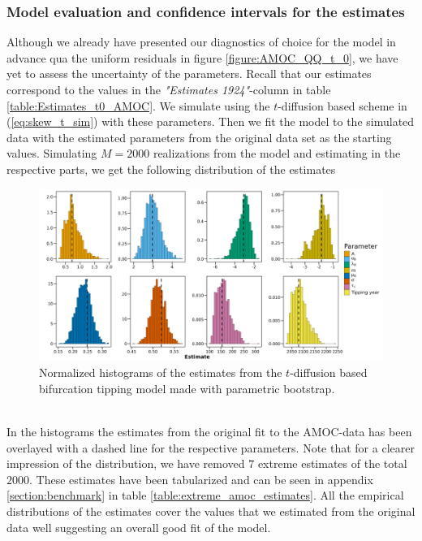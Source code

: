 \subsubsection{Model evaluation and confidence intervals for the estimates}
Although we already have presented our diagnostics of choice for the model in advance qua the uniform residuals in figure \ref{figure:AMOC_QQ_t_0}, we have yet to assess the uncertainty of the parameters. Recall that our estimates correspond to the values in the \textit{"Estimates 1924"}-column in table \ref{table:Estimates_t0_AMOC}. We simulate using the $t$-diffusion based scheme in (\ref{eq:skew_t_sim}) with these parameters. Then we fit the model to the simulated data with the estimated parameters from the original data set as the starting values. Simulating $M = 2000$ realizations from the model and estimating in the respective parts, we get the following distribution of the estimates
\begin{figure}[h!]
    \begin{center}
    \includegraphics[scale = .095]{figures/estim_tibble_plot.jpeg}
    \caption{Normalized histograms of the estimates from the $t$-diffusion based bifurcation tipping model made with parametric bootstrap.}
    \label{figure:AMOC_parametric_bootstrap}
    \end{center}
\end{figure}\\
In the histograms the estimates from the original fit to the AMOC-data has been overlayed with a dashed line for the respective parameters. Note that for a clearer impression of the distribution, we have removed $7$ extreme estimates of the total $2000$. These estimates have been tabularized and can be seen in appendix \ref{section:benchmark} in table \ref{table:extreme_amoc_estimates}. All the empirical distributions of the estimates cover the values that we estimated from the original data well suggesting an overall good fit of the model.
